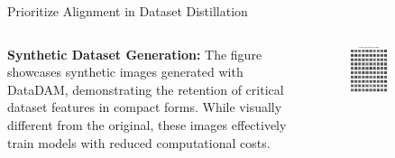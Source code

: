 \documentclass[final]{beamer}
\newlength{\sepwidth}
\newlength{\colwidth}
\newcommand{\separatorcolumn}{\begin{column}{\sepwidth}\end{column}}
\begin{document}
\begin{columns}
\begin{column}{\colwidth}
	\end{column}
	\separatorcolumn
	\begin{column}{\colwidth}
		\begin{block}{Prioritize Alignment in Dataset Distillation}
			\begin{columns}
				\begin{column}{0.5\textwidth}
					\textbf{Synthetic Dataset Generation:}  
					The figure showcases synthetic images generated with DataDAM, demonstrating the retention of critical dataset features in compact forms. While visually different from the original, these images effectively train models with reduced computational costs.  
				\end{column}
				\begin{column}{0.5\textwidth}
					\begin{figure}
						\includegraphics[width=\linewidth]{../report/figures/synthetic_images_task2.png}
					\end{figure}
				\end{column}


\end{columns}
\end{block}
\end{column}
\end{columns}
\end{document}

